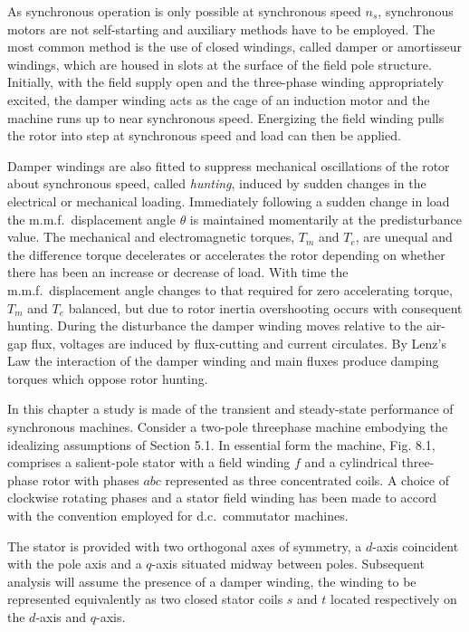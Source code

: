 \documentclass[a4paper,numbers=noenddot,12pt]{scrbook}
\begin{document}
As synchronous operation is only possible at synchronous speed $n_s$, synchronous motors are not self-starting and auxiliary methods have to be employed. The most common method is the use of closed windings, called damper or amortisseur windings, which are housed in slots at the surface of the field pole structure. Initially, with the field supply open and the three-phase winding appropriately excited, the damper winding acts as the cage of an induction motor and the machine runs up to near synchronous speed. Energizing the field winding pulls the rotor into step at synchronous speed and load can then be applied.

Damper windings are also fitted to suppress mechanical oscillations of the rotor about synchronous speed, called \textit{hunting}, induced by sudden changes in the electrical or mechanical loading. Immediately following a sudden change in load the m.m.f.\ displacement angle $\theta$ is maintained momentarily at the predisturbance value. The mechanical and electromagnetic torques, $T_m$ and $T_e$, are unequal and the difference torque decelerates or accelerates the rotor depending on whether
there has been an increase or decrease of load. With time the m.m.f.\ displacement angle changes to that required for zero accelerating torque, $T_m$ and $T_e$ balanced, but due to rotor inertia overshooting occurs with consequent hunting. During the disturbance the damper winding moves relative to the air-gap flux, voltages are induced by flux-cutting and current circulates. By Lenz's Law the interaction of the damper winding and main fluxes produce damping torques which oppose rotor hunting.

In this chapter a study is made of the transient and steady-state performance of synchronous machines. Consider a two-pole three­phase machine embodying the idealizing assumptions of Section 5.1. In essential form the machine, Fig. 8.1, comprises a salient-pole stator with a field winding $f$ and a cylindrical three-phase rotor with phases $abc$ represented as three concentrated coils. A choice of clockwise rotating phases and a stator field winding has been made to accord with the convention employed for d.c.\ commutator machines.

The stator is provided with two orthogonal axes of symmetry, a $d$-axis coincident with the pole axis and a $q$-axis situated midway between poles. Subsequent analysis will assume the presence of a damper winding, the winding to be represented equivalently as two closed stator coils $s$ and $t$ located respectively on the $d$-axis and $q$-axis.
\end{document}

